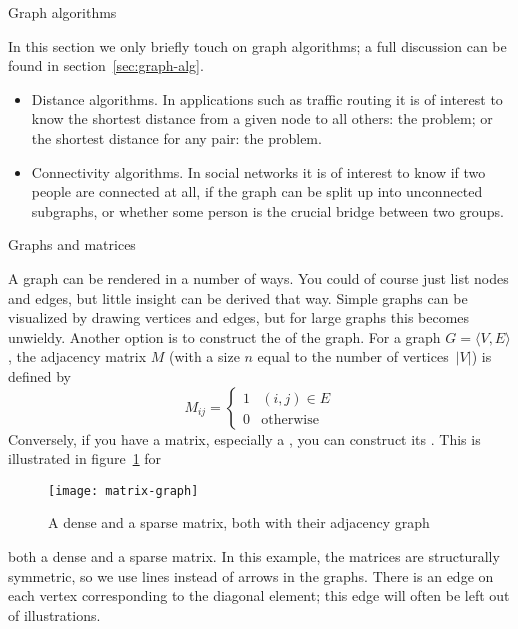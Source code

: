 
 {Graph algorithms}

In this section we only briefly touch on graph algorithms; a full
discussion can be found in section~\ref{sec:graph-alg}.

\begin{itemize}
\item Distance algorithms. In applications such as traffic routing it
  is of interest to know the shortest distance from a given node to
  all others: the  problem;
  or the shortest distance for any pair: the
   problem.
\item Connectivity algorithms. In social networks it is of interest to
  know if two people are connected at all, if the graph can be split
  up into unconnected subgraphs, or whether some person is the crucial
  bridge between two groups.
\end{itemize}

 {Graphs and matrices}

A graph can be rendered in a number of ways. You could of course just
list nodes and edges, but little insight can be derived that way.
Simple graphs can be  visualized by drawing vertices and edges, but
for large graphs this becomes unwieldy. Another option is to construct
the  of the graph. For a graph $G=\langle
V,E\rangle$, the adjacency matrix $M$ (with a size $n$ equal to the
number of vertices~$|V|$) is defined by
\[ 
  M_{ij}=
  \begin{cases}1&(i,j)\in E\\ 0&\mbox{otherwise}\end{cases}
\]
Conversely, if you have a matrix, especially a
, you can construct its
.
This is illustrated in figure~\ref{fig:matrix-graph} for
\begin{figure}[ht]
  \texttt{[image: matrix-graph]}
  \caption{A dense and a sparse matrix, both with their adjacency
    graph}
  \label{fig:matrix-graph}
\end{figure}
both a dense and a sparse matrix. In this example, the matrices are
structurally symmetric, so we use lines instead of arrows in the
graphs. There is an edge on each vertex corresponding to the diagonal
element; this edge will often be left out of illustrations.

